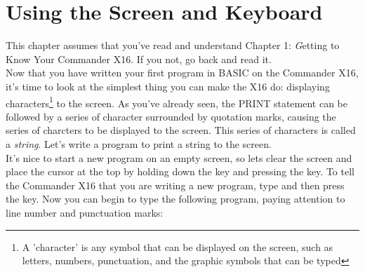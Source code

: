 
\makeatletter\@openrightfalse
\part{Using the Screen and Keyboard}


\newpage
{}

This chapter assumes that you've read and understand Chapter 1: {\emph Getting
to Know Your Commander X16}.  If you not, go back and read it.\\

Now that you have written your first program in BASIC on the Commander X16,
it's time to look at the simplest thing you can make the X16 do: displaying
characters\footnote{A 'character' is any symbol that can be displayed on the
screen, such as letters, numbers, punctuation, and the graphic symbols that can
be typed} to the screen.  As you've already seen, the {\ttfamily PRINT}
statement can be followed by a series of character surrounded by quotation
marks, causing the series of charcters to be displayed to the screen.  This
series of characters is called a {\em string}.  Let's write a program to print
a string to the screen.\\

It's nice to start a new program on an empty screen, so lets clear the screen
and place the cursor at the top by holding down the \shiftkey key and pressing
the \clrhomekey key.  To tell the Commander X16 that you are writing a new
program, type  and then press
the \returnkey key.  Now you can begin to type the following program, paying
attention to line number and punctuation marks:\\

 \spacebar {} \spacebar
{}\key{,} \spacebar
{}\key{!} \returnkey

